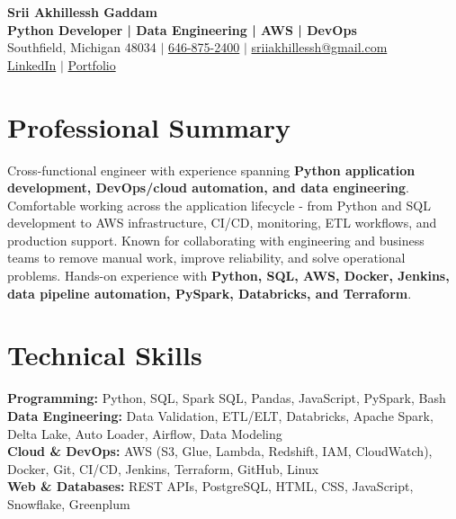 \documentclass[letterpaper,10pt]{article}
\begin{document}
\fontsize{9.35pt}{10.45pt}\selectfont

\begin{center}
    {\LARGE \textbf{Srii Akhillessh Gaddam}} \\[-1pt]
    \textbf{Python Developer | Data Engineering | AWS | DevOps} \\[2pt]
    Southfield, Michigan 48034 $|$
    \href{tel:6468752400}{646-875-2400} $|$
    \href{mailto:sriiakhillessh@gmail.com}{sriiakhillessh@gmail.com} \\[1pt]
    \href{https://www.linkedin.com/in/srii-akhiilessh-gaddam-b48668191/}{LinkedIn} $|$
    \href{https://sriiakhillesshg.github.io/portfolio/}{Portfolio}
\end{center}
\vspace{-8pt}

\section{Professional Summary}
\small{Cross-functional engineer with experience spanning \textbf{Python application development, DevOps/cloud automation, and data engineering}. Comfortable working across the application lifecycle - from Python and SQL development to AWS infrastructure, CI/CD, monitoring, ETL workflows, and production support. Known for collaborating with engineering and business teams to remove manual work, improve reliability, and solve operational problems. Hands-on experience with \textbf{Python, SQL, AWS, Docker, Jenkins, data pipeline automation, PySpark, Databricks, and Terraform}.}

\section{Technical Skills}
\small{
\textbf{Programming:} Python, SQL, Spark SQL, Pandas, JavaScript, PySpark, Bash \\
\textbf{Data Engineering:} Data Validation, ETL/ELT, Databricks, Apache Spark, Delta Lake, Auto Loader, Airflow, Data Modeling \\
\textbf{Cloud \& DevOps:} AWS (S3, Glue, Lambda, Redshift, IAM, CloudWatch), Docker, Git, CI/CD, Jenkins, Terraform, GitHub, Linux \\
\textbf{Web \& Databases:} REST APIs, PostgreSQL, HTML, CSS, JavaScript, Snowflake, Greenplum
}
\end{document}
